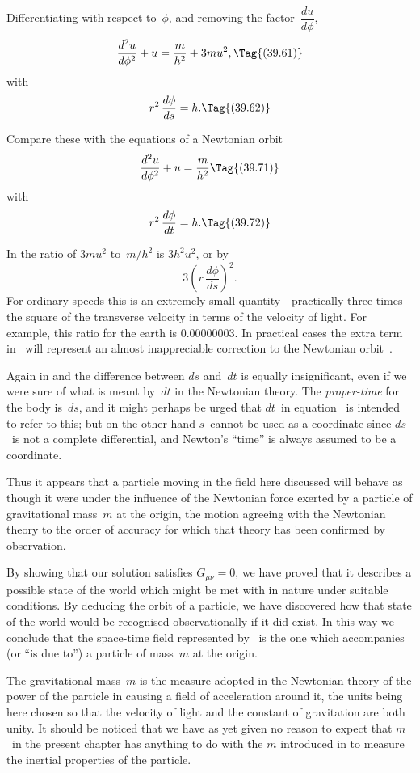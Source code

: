 \documentclass[12pt]{book}
\begin{document}
Differentiating with respect to~$\phi$, and removing the factor~$\dfrac{du}{d\phi}$,
\[
\frac{d^{2}u}{d\phi^{2}} + u = \frac{m}{h^{2}} + 3mu^{2},
\Tag{(39.61)}
\]
with
\[
r^{2}\, \frac{d\phi}{ds} = h.
\Tag{(39.62)}
\]

Compare these with the equations of a Newtonian orbit
\[
\frac{d^{2}u}{d\phi^{2}} + u = \frac{m}{h^{2}}
\Tag{(39.71)}
\]
with
\[
r^{2}\, \frac{d\phi}{dt} = h.
\Tag{(39.72)}
\]

In  the ratio of $3mu^{2}$ to~$m/h^{2}$ is $3h^{2}u^{2}$, or by 
\[
3\left(r\, \frac{d\phi}{ds}\right)^{2}.
\]
For ordinary speeds this is an extremely small quantity---practically three
times the square of the transverse velocity in terms of the velocity of light.
For example, this ratio for the earth is 0.00000003. In practical cases the extra
term in~ will represent an almost inappreciable correction to the Newtonian
orbit~.

Again in  and  the difference between $ds$ and~$dt$ is equally
insignificant, even if we were sure of what is meant by~$dt$ in the Newtonian
theory. The \emph{proper-time} for the body is~$ds$, and it might perhaps be urged
%
that $dt$~in equation~ is intended to refer to this; but on the other hand
$s$~cannot be used as a coordinate since $ds$~is not a complete differential, and
Newton's ``time'' is always assumed to be a coordinate.

Thus it appears that a particle moving in the field here discussed will
behave as though it were under the influence of the Newtonian force exerted
by a particle of gravitational mass~$m$ at the origin, the motion agreeing with
the Newtonian theory to the order of accuracy for which that theory has been
confirmed by observation.

By showing that our solution satisfies $G_{\mu\nu} = 0$, we have proved that it
describes a possible state of the world which might be met with in nature
under suitable conditions. By deducing the orbit of a particle, we have discovered
how that state of the world would be recognised observationally if it
did exist. In this way we conclude that the space-time field represented by~
is the one which accompanies (or ``is due to'') a particle of mass~$m$ at
the origin.

The gravitational mass~$m$ is the measure adopted in the Newtonian theory
of the power of the particle in causing a field of acceleration around it, the
units being here chosen so that the velocity of light and the constant of gravitation
are both unity. It should be noticed that we have as yet given no
reason to expect that $m$~in the present chapter has anything to do with the
$m$ introduced in  to measure the inertial properties of the particle.
\end{document}
